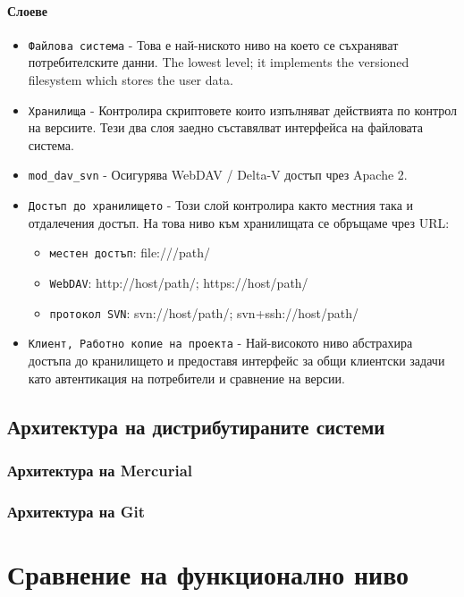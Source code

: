 \documentclass[a4paper]{article}
\begin{document}
    \paragraph{Слоеве}

    \begin{itemize}
      \item \texttt{Файлова система} - Това е най-ниското ниво на което се съхраняват потребителските данни.
    The lowest level; it implements the versioned filesystem which stores the user data.
      \item \texttt{Хранилища} - Контролира скриптовете които изпълняват действията по контрол на версиите. Тези два слоя заедно съставялват интерфейса на файловата система.
      \item \texttt{mod\_dav\_svn} - Осигурява WebDAV / Delta-V достъп чрез Apache 2.
      \item \texttt{Достъп до хранилището} - Този слой контролира както местния така и отдалечения достъп. На това ниво към хранилищата се обръщаме чрез URL:
        \begin{itemize}
          \item \texttt{местен достъп}: file:///path/
          \item \texttt{WebDAV}: http://host/path/; https://host/path/
          \item \texttt{протокол SVN}: svn://host/path/; svn+ssh://host/path/
        \end{itemize}
      \item \texttt{Клиент, Работно копие на проекта} - Най-високото ниво абстрахира достъпа до кранилището и предоставя интерфейс за общи клиентски задачи като автентикация на потребители и сравнение на версии.
    \end{itemize}

  \subsection{Архитектура на дистрибутираните системи}
    \subsubsection{Архитектура на Mercurial}
    \subsubsection{Архитектура на Git}

\section{Сравнение на функционално ниво}
\end{document}
